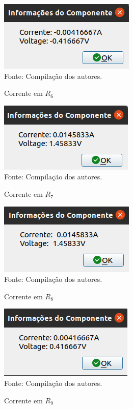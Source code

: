 \documentclass[twocolumn, 10pt]{extarticle}
\begin{document}
\begin{figure}[H]
	\caption{Corrente em $R_6$} 
	\centering
	\includegraphics[scale=0.7]{ir6}
	\\ Fonte: Compilação dos autores.
\end{figure}

\begin{figure}[H]
	\caption{Corrente em $R_7$} 
	\centering
	\includegraphics[scale=0.7]{ir7}
	\\ Fonte: Compilação dos autores.
\end{figure}

\begin{figure}[H]
	\caption{Corrente em $R_8$} 
	\centering
	\includegraphics[scale=0.7]{ir8}
	\\ Fonte: Compilação dos autores.
\end{figure}

\begin{figure}[H]
	\caption{Corrente em $R_9$} 
	\centering
	\includegraphics[scale=0.7]{ir9}
	\\ Fonte: Compilação dos autores.
\end{figure}
\end{document}
